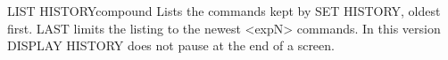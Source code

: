 \begin{XbaseEntry}{LIST HISTORY}{compound}
Lists the commands kept by SET HISTORY, oldest first.
\Syntax
{}
\Usage
LAST limits the listing to the newest <expN> commands.  In this version
DISPLAY HISTORY does not pause at the end of a screen.
\end{XbaseEntry}
